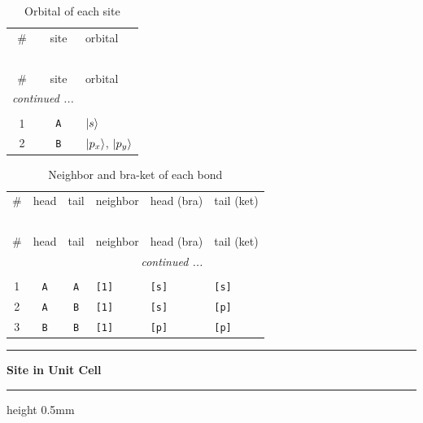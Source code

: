 \documentclass[fleqn,10pt,landscape]{jsarticle}
\begin{document}
\renewcommand{\arraystretch}{1.6}
\begin{longtable}[l]{ccl}
\captionsetup{justification=raggedright, singlelinecheck=off}
\caption{Orbital of each site}
 \\
 \hline \hline
\# & site & orbital \\ \hline \endfirsthead

\multicolumn{2}{l}{\tablename\ \thetable{}} \\
 \hline \hline
\# & site & orbital \\ \hline \endhead

 \hline \hline
\multicolumn{2}{r}{\footnotesize\it continued ...} \\ \endfoot

 \hline \hline
\multicolumn{2}{r}{} \\ \endlastfoot

1 & \texttt{A} & $\ket{s}$ \\ \hline
2 & \texttt{B} & $\ket{p_{x}}$, $\ket{p_{y}}$ \\
\end{longtable}
\renewcommand{\arraystretch}{1.6}
\begin{longtable}[l]{ccclll}
\captionsetup{justification=raggedright, singlelinecheck=off}
\caption{Neighbor and bra-ket of each bond}
 \\
 \hline \hline
\# & head & tail & neighbor & head (bra) & tail (ket) \\ \hline \endfirsthead

\multicolumn{5}{l}{\tablename\ \thetable{}} \\
 \hline \hline
\# & head & tail & neighbor & head (bra) & tail (ket) \\ \hline \endhead

 \hline \hline
\multicolumn{5}{r}{\footnotesize\it continued ...} \\ \endfoot

 \hline \hline
\multicolumn{5}{r}{} \\ \endlastfoot

1 & \texttt{A} & \texttt{A} & \texttt{[1]} & \texttt{[s]} & \texttt{[s]} \\ \hline
2 & \texttt{A} & \texttt{B} & \texttt{[1]} & \texttt{[s]} & \texttt{[p]} \\ \hline
3 & \texttt{B} & \texttt{B} & \texttt{[1]} & \texttt{[p]} & \texttt{[p]} \\
\end{longtable}
\vspace{5mm}
\noindent \rule[0.5mm]{5mm}{0.5mm}\hspace{3mm}\textbf{Site in Unit Cell}\hspace{3mm}\leaders\hrule height 0.5mm\hfill\kern0pt
\vspace{3mm}
\end{document}
